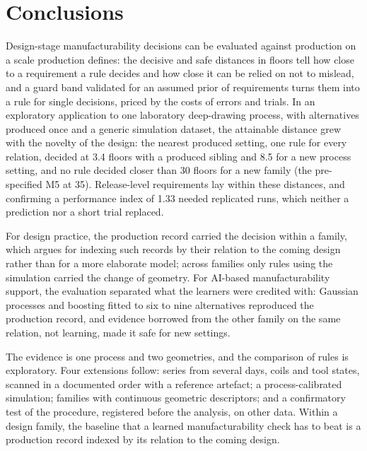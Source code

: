 \documentclass[pdflatex,sn-basic,lineno]{sn-jnl}
\begin{document}
\section{Conclusions}\label{sec:conclusion}

Design-stage manufacturability decisions can be evaluated against production on a scale production defines: the decisive and safe distances in floors tell how close to a requirement a rule decides and how close it can be relied on not to mislead, and a guard band validated for an assumed prior of requirements turns them into a rule for single decisions, priced by the costs of errors and trials. In an exploratory application to one laboratory deep-drawing process, with alternatives produced once and a generic simulation dataset, the attainable distance grew with the novelty of the design: the nearest produced setting, one rule for every relation, decided at 3.4 floors with a produced sibling and 8.5 for a new process setting, and no rule decided closer than 30 floors for a new family (the pre-specified M5 at 35). Release-level requirements lay within these distances, and confirming a performance index of 1.33 needed replicated runs, which neither a prediction nor a short trial replaced.

For design practice, the production record carried the decision within a family, which argues for indexing such records by their relation to the coming design rather than for a more elaborate model; across families only rules using the simulation carried the change of geometry. For AI-based manufacturability support, the evaluation separated what the learners were credited with: Gaussian processes and boosting fitted to six to nine alternatives reproduced the production record, and evidence borrowed from the other family on the same relation, not learning, made it safe for new settings.

The evidence is one process and two geometries, and the comparison of rules is exploratory. Four extensions follow: series from several days, coils and tool states, scanned in a documented order with a reference artefact; a process-calibrated simulation; families with continuous geometric descriptors; and a confirmatory test of the procedure, registered before the analysis, on other data. Within a design family, the baseline that a learned manufacturability check has to beat is a production record indexed by its relation to the coming design.


\backmatter
\end{document}
